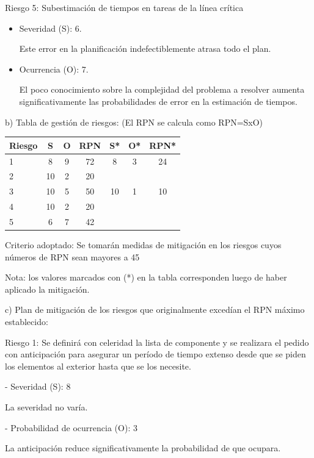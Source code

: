 \documentclass[
11pt, %
codirector, %
]{charter}
\begin{document}
	Riesgo 5: Subestimación de tiempos en tareas de la línea crítica
	\begin{itemize}
		\item Severidad (S): 6.

		      Este error en la planificación indefectiblemente atrasa todo el plan.

		\item Ocurrencia (O): 7.

		      El poco conocimiento sobre la complejidad del problema a resolver aumenta significativamente las probabilidades de error en la estimación de tiempos.
	\end{itemize}
	b) Tabla de gestión de riesgos:      (El RPN se calcula como RPN=SxO)
	\begin{table}[htpb]
		\centering
		\begin{tabularx}{\linewidth}{@{}|X|c|c|c|c|c|c|@{}}
			\hline
			\rowcolor[HTML]{C0C0C0}
			Riesgo & S  & O & RPN & S* & O* & RPN* \\ \hline
			1      & 8  & 9 & 72  & 8  & 3  & 24   \\ \hline
			2      & 10 & 2 & 20  &    &    &      \\ \hline
			3      & 10 & 5 & 50  & 10 & 1  & 10   \\ \hline
			4      & 10 & 2 & 20  &    &    &      \\ \hline
			5      & 6  & 7 & 42  &    &    &      \\ \hline
		\end{tabularx}%
	\end{table}

	Criterio adoptado:
	Se tomarán medidas de mitigación en los riesgos cuyos números de RPN sean mayores a 45

	Nota: los valores marcados con (*) en la tabla corresponden luego de haber aplicado la mitigación.

	c) Plan de mitigación de los riesgos que originalmente excedían el RPN máximo establecido:

	Riesgo 1: Se definirá con celeridad la lista de componente y se realizara el pedido con anticipación para asegurar un período de tiempo extenso desde que se piden los elementos al exterior hasta que se los necesite.
	
	- Severidad (S): 8
	
	La severidad no varía.

	- Probabilidad de ocurrencia (O): 3
	
	La anticipación reduce significativamente la probabilidad de que ocupara.
\end{document}
